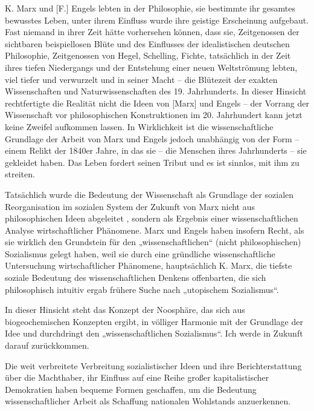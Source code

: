 \documentclass[11pt,a4paper]{book}
\begin{document}
K. Marx und [F.] Engels lebten in der Philosophie, sie bestimmte ihr gesamtes bewusstes Leben, unter ihrem Einfluss wurde ihre geistige Erscheinung aufgebaut. Fast niemand in ihrer Zeit hätte vorhersehen können, dass sie, Zeitgenossen der sichtbaren beispiellosen Blüte und des Einflusses der idealistischen deutschen Philosophie, Zeitgenossen von Hegel, Schelling, Fichte, tatsächlich in der Zeit ihres tiefen Niedergangs und der Entstehung einer neuen Weltströmung lebten, viel tiefer und verwurzelt und in seiner Macht -- die Blütezeit der exakten Wissenschaften und Naturwissenschaften des 19. Jahrhunderts. In dieser Hinsicht rechtfertigte die Realität nicht die Ideen von [Marx] und Engels -- der Vorrang der Wissenschaft vor philosophischen Konstruktionen im 20. Jahrhundert kann jetzt keine Zweifel aufkommen lassen. In Wirklichkeit ist die wissenschaftliche Grundlage der Arbeit von Marx und Engels jedoch unabhängig von der Form -- einem Relikt der 1840er Jahre, in das sie -- die Menschen ihres Jahrhunderts -- sie gekleidet haben. Das Leben fordert seinen Tribut und es ist sinnlos, mit ihm zu streiten.



Tatsächlich wurde die Bedeutung der Wissenschaft als Grundlage der sozialen Reorganisation im sozialen System der Zukunft von Marx nicht aus philosophischen Ideen abgeleitet , sondern als Ergebnis einer wissenschaftlichen Analyse wirtschaftlicher Phänomene. Marx und Engels haben insofern Recht, als sie wirklich den Grundstein für den „wissenschaftlichen“ (nicht philosophischen) Sozialismus gelegt haben, weil sie durch eine gründliche wissenschaftliche Untersuchung wirtschaftlicher Phänomene, hauptsächlich K. Marx, die tiefste soziale Bedeutung des wissenschaftlichen Denkens offenbarten, die sich philosophisch intuitiv ergab frühere Suche nach „utopischem Sozialismus“.



In dieser Hinsicht steht das Konzept der Noosphäre, das sich aus biogeochemischen Konzepten ergibt, in völliger Harmonie mit der Grundlage der Idee und durchdringt den „wissenschaftlichen Sozialismus“. Ich werde in Zukunft darauf zurückkommen.



Die weit verbreitete Verbreitung sozialistischer Ideen und ihre Berichterstattung über die Machthaber, ihr Einfluss auf eine Reihe großer kapitalistischer Demokratien haben bequeme Formen geschaffen, um die Bedeutung wissenschaftlicher Arbeit als Schaffung nationalen Wohlstands anzuerkennen.
\end{document}

